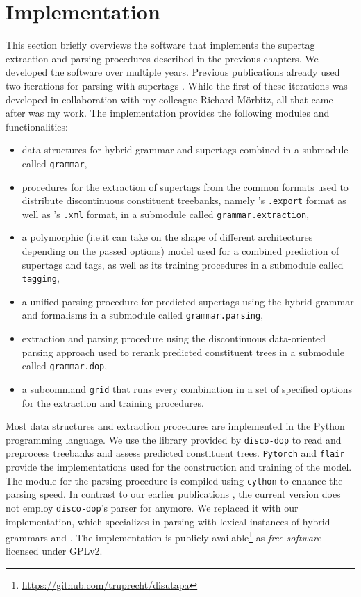 \documentclass[../../document.tex]{subfiles}
\begin{document}
    \section{Implementation}\label{sec:implementation}
    This section briefly overviews the software that implements the supertag extraction and parsing procedures described in the previous chapters.
    We developed the software over multiple years. Previous publications already used two iterations for parsing with  supertags \citep{RupMoe21,Rup22}.
    While the first of these iterations was developed in collaboration with my colleague Richard Mörbitz, all that came after was my work.
    The implementation provides the following modules and functionalities:
    \begin{itemize}
        \item data structures for hybrid grammar and  supertags combined in a submodule called \texttt{grammar},
        \item procedures for the extraction of supertags from the common formats used to distribute discontinuous constituent treebanks, namely \negra{}'s \texttt{.export} format as well as \tiger{}'s \texttt{.xml} format, in a submodule called \texttt{grammar.extraction},
        \item a polymorphic (i.e.\@ it can take on the shape of different architectures depending on the passed options)  model used for a combined prediction of supertags and  tags, as well as its training procedures in a submodule called \texttt{tagging},
        \item a unified parsing procedure for predicted supertags using the hybrid grammar and  formalisms in a submodule called \texttt{grammar.parsing},
        \item extraction and parsing procedure using the discontinuous data-oriented parsing approach used to rerank predicted constituent trees in a submodule called \texttt{grammar.dop},
        \item a subcommand \texttt{grid} that runs every combination in a set of specified options for the extraction and training procedures.
    \end{itemize}

    Most data structures and extraction procedures are implemented in the Python programming language.
    We use the library provided by \texttt{disco-dop} \citep{Cra12} to read and preprocess treebanks and assess predicted constituent trees.
    \texttt{Pytorch} \citep{paszke2019pytorch} and \texttt{flair} \citep{Akb19} provide the implementations used for the construction and training of the  model.
    The module for the parsing procedure is compiled using \texttt{cython} \citep{behnel2011cython} to enhance the parsing speed.
    In contrast to our earlier publications \citet{RupMoe21,Rup22}, the current version does not employ \texttt{disco-dop}'s parser for  anymore.
    We replaced it with our implementation, which specializes in parsing with lexical instances of hybrid grammars and .
    The implementation is publicly available\footnote{\url{https://github.com/truprecht/disutapa}} as \emph{free software} licensed under GPLv2.
\end{document}
